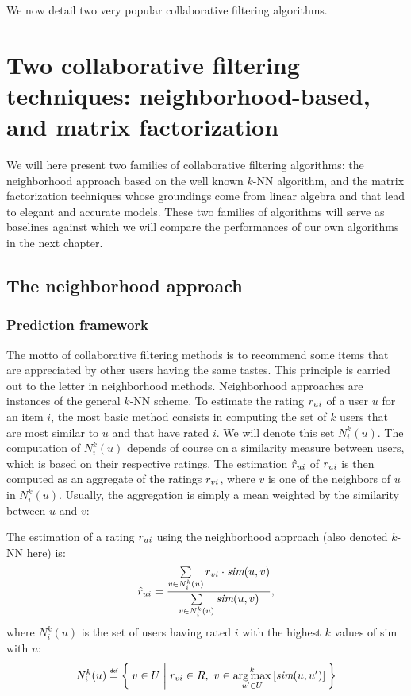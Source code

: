 We now detail two very popular collaborative filtering algorithms.

\section{Two collaborative filtering techniques: neighborhood-based, and matrix
factorization}
\label{SEC:neighborhood_and_matrix_facto_review}

We will here present two families of collaborative filtering algorithms: the
neighborhood approach based on the well known $k$-NN algorithm, and the matrix
factorization techniques whose groundings come from linear algebra and that
lead to elegant and accurate models. These two families of algorithms will
serve as baselines against which we will compare the performances of our own
algorithms in the next chapter.

\subsection{The neighborhood approach}
\label{SEC:neighborhood_approach}

\subsubsection{Prediction framework}

The motto of collaborative filtering methods is to recommend some items that
are appreciated by other users having the same tastes. This principle is
carried out to the letter in neighborhood methods. Neighborhood approaches are instances of the general $k$-NN scheme. To estimate
the rating $r_{ui}$ of a user $u$ for an item $i$, the most basic method consists
in computing  the set of $k$ users that are most similar to $u$ and
that have rated $i$. We will denote this set $N_i^k(u)$. The computation of
$N_i^k(u)$ depends of course on a similarity measure between users, which is
based on their respective ratings. The estimation $\hat{r}_{ui}$ of $r_{ui}$ is then
computed as an aggregate of the ratings $r_{vi}$, where $v$ is one of the
neighbors of $u$ in $N_i^k(u)$. Usually, the aggregation is simply a mean
weighted by the similarity between $u$ and $v$:

\begin{definition}
  The estimation of a rating $r_{ui}$ using the neighborhood approach (also
  denoted $k$-NN here) is:
  $$\hat{r}_{ui} = \frac{\sum\limits_{v \in N_i^k(u)} r_{vi} \cdot \emph{sim}(u, v)}
  {\sum\limits_{v \in N_i^k(u)}\emph{sim}(u, v)},$$
  where $N_i^k(u)$ is the set of users having rated $i$ with the highest $k$
  values of sim with $u$:
  $$N_i^k(u) \eqdef \Set{v \in U | \rvi \in R,~v\in \argmax_{u' \in
  U}^k\left[\emph{sim}(u, u')\right]}$$
\end{definition}

